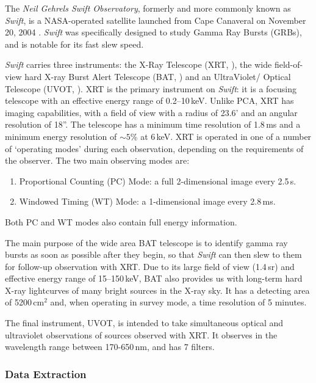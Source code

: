 \par The \textit{Neil Gehrels Swift Observatory}, formerly and more commonly known as \textit{Swift}, is a NASA-operated satellite launched from Cape Canaveral on November 20, 2004 \citep{Gehrels_Swift}.  \textit{Swift} was specifically designed to study Gamma Ray Bursts (GRBs), and is notable for its fast slew speed.
\par \textit{Swift} carries three instruments: the X-Ray Telescope (XRT, \citealp{Burrows_XRT}), the wide field-of-view hard X-ray Burst Alert Telescope (BAT, \citealp{Krimm_BAT}) and an UltraViolet/ Optical Telescope (UVOT, \citealp{Roming_UVOT}).  XRT is the primary instrument on \textit{Swift}: it is a focusing telescope with an effective energy range of 0.2--10\,keV.  Unlike PCA, XRT has imaging capabilities, with a field of view with a radius of 23.6' and an angular resolution of 18''.  The telescope has a minimum time resolution of 1.8\,ms and a minimum energy resolution of $\sim5$\% at 6\,keV.  XRT is operated in one of a number of `operating modes' during each observation, depending on the requirements of the observer.  The two main observing modes are:
\begin{enumerate}
\item Proportional Counting (PC) Mode: a full 2-dimensional image every 2.5\,s.
\item Windowed Timing (WT) Mode: a 1-dimensional image every 2.8\,ms.
\end{enumerate}
Both PC and WT modes also contain full energy information.
\par The main purpose of the wide area BAT telescope is to identify gamma ray bursts as soon as possible after they begin, so that \textit{Swift} can then slew to them for follow-up observation with XRT.  Due to its large field of view (1.4\,sr) and effective energy range of 15--150\,keV, BAT also provides us with long-term hard X-ray lightcurves of many bright sources in the X-ray sky.  It has a detecting area of 5200\,cm$^2$ and, when operating in survey mode, a time resolution of 5 minutes.
\par The final instrument, UVOT, is intended to take simultaneous optical and ultraviolet observations of sources observed with XRT.  It observes in the wavelength range between 170-650\,nm, and has 7 filters.

\subsubsection{Data Extraction}

